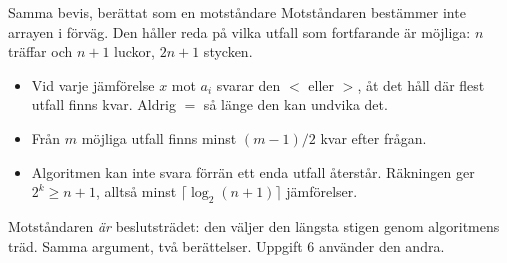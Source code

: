 {\kaninbg
\begin{frame}{\kh Samma bevis, berättat som en motståndare}
\small
Motståndaren bestämmer inte arrayen i förväg. Den håller reda på vilka utfall som fortfarande
är möjliga: $n$ träffar och $n+1$ luckor, $2n+1$ stycken.
\begin{itemize}\setlength{\itemsep}{3pt}
  \item Vid varje jämförelse $x$ mot $a_i$ svarar den $<$ eller $>$, åt det håll där flest
        utfall finns kvar. Aldrig $=$ så länge den kan undvika det.
  \item Från $m$ möjliga utfall finns minst $(m-1)/2$ kvar efter frågan.
  \item Algoritmen kan inte svara förrän ett enda utfall återstår. Räkningen ger
        $2^k\ge n+1$, alltså minst $\lceil\log_2(n+1)\rceil$ jämförelser.
\end{itemize}
\vfill
\begin{kaninbox}[fontupper=\footnotesize]
Motståndaren \emph{är} beslutsträdet: den väljer den längsta stigen genom algoritmens träd. Samma
argument, två berättelser. Uppgift 6 använder den andra.
\end{kaninbox}
\end{frame}}

